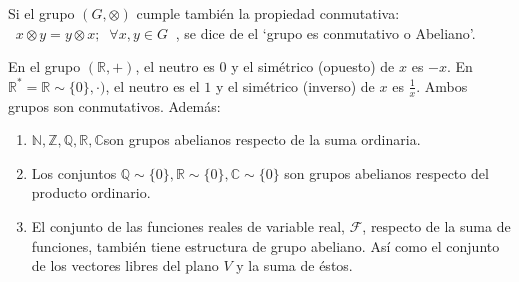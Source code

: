 \begin{defi}
Si el grupo $(G,\otimes)$ cumple también la propiedad conmutativa:
$\; \; x \otimes y = y \otimes x; \; \; \forall x,y \in G \; \; $,
se dice de el `grupo es conmutativo o Abeliano'. 
\end{defi}
\begin{ejem}
	En el grupo $(\mathbb R, +)$, el neutro es $0$ y el simétrico (opuesto) de $x$ es $-x$. En $\mathbb R^*=\mathbb R \sim \{0\}, \cdot)$, el neutro es el $1$ y el simétrico (inverso) de $x$ es $\frac 1 x$. Ambos grupos son conmutativos. Además:
	\vspace{-2mm}
	\begin{enumerate}
	\item $\mathbb N, \mathbb Z, \mathbb Q, \mathbb R, \mathbb C$son grupos abelianos respecto de la suma ordinaria.
	\item Los conjuntos 	$\mathbb Q \sim \{0\}, \mathbb R \sim \{0\}, \mathbb C \sim \{0\}$ son grupos abelianos respecto del producto ordinario.
	\item El conjunto de las funciones reales de variable real, $\mathcal F$, respecto de la suma de funciones, también tiene estructura de grupo abeliano. Así como el conjunto de los vectores libres del plano $V$ y la suma de éstos.
	\end{enumerate}
\end{ejem}

